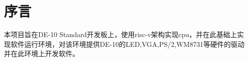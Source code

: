 %
% 
% 
% 
% 
% 
% 
%

\chapter{序言}
本项目旨在DE-10 Standard开发板上，使用risc-v架构实现cpu，并在此基础上实现软件运行环境，对该环境提供DE-10的LED,VGA,PS/2,WM8731等硬件的驱动并在此环境上开发软件。\\